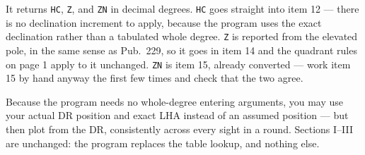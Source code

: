 \documentclass[10pt]{article}
\begin{document}
It returns \texttt{HC}, \texttt{Z}, and \texttt{ZN} in decimal degrees.
\texttt{HC} goes straight into item 12 --- there is no declination increment to
apply, because the program uses the exact declination rather than a tabulated
whole degree. \texttt{Z} is reported from the elevated pole, in the same sense as
Pub.\ 229, so it goes in item 14 and the quadrant rules on page 1 apply to it
unchanged. \texttt{ZN} is item 15, already converted --- work item 15 by hand
anyway the first few times and check that the two agree.

\vspace{0.6ex}
Because the program needs no whole-degree entering arguments, you may use your actual
DR position and exact LHA instead of an assumed position --- but then plot from the
DR, consistently across every sight in a round. Sections I--III are unchanged: the
program replaces the table lookup, and nothing else.
\end{document}
